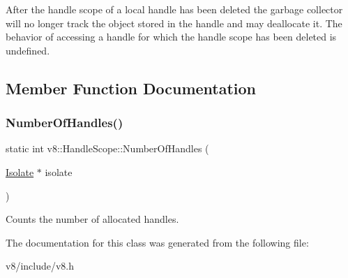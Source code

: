 After the handle scope of a local handle has been deleted the garbage collector will no longer track the object stored in the handle and may deallocate it. The behavior of accessing a handle for which the handle scope has been deleted is undefined. 

\subsection{Member Function Documentation}
\mbox{\label{classv8_1_1HandleScope_abab7214c9b9388b02f575fd5270b7e2f}} 
\subsubsection{\texorpdfstring{Number\+Of\+Handles()}{NumberOfHandles()}}
{\footnotesize\ttfamily static int v8\+::\+Handle\+Scope\+::\+Number\+Of\+Handles (\begin{DoxyParamCaption}\item[{\mbox{\hyperlink{classv8_1_1Isolate}{Isolate}} $\ast$}]{isolate }\end{DoxyParamCaption})\hspace{0.3cm}{\ttfamily [static]}}

Counts the number of allocated handles. 

The documentation for this class was generated from the following file\+:\begin{DoxyCompactItemize}
\item 
v8/include/v8.\+h\end{DoxyCompactItemize}
